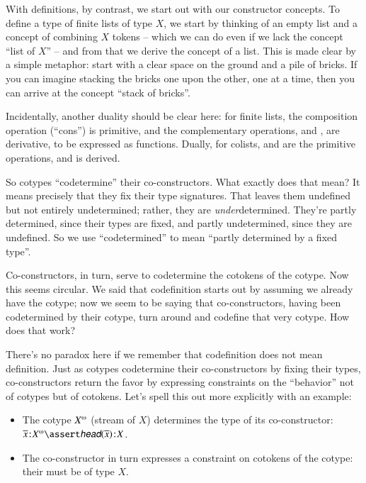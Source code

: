 \documentclass{article}
\begin{document}
With definitions, by contrast, we start out with our constructor
concepts. To define a type of finite lists of type \(X\), we start by
thinking of an empty list and a concept of combining \(X\) tokens --
which we can do even if we lack the concept ``list of \(X\)'' -- and
from that we derive the concept of a list. This is made clear by a
simple metaphor: start with a clear space on the ground and a pile of
bricks. If you can imagine stacking the bricks one upon the other, one
at a time, then you can arrive at the concept ``stack of bricks''.

Incidentally, another duality should be clear here: for finite lists,
the composition operation (``cons'') is primitive, and the
complementary operations, \head{} and \tail{}, are derivative, to be
expressed as functions. Dually, for colists, \cohead{} and \cotail{}
are the primitive operations, and \cocons{} is derived.

So cotypes ``codetermine'' their co-constructors. What exactly does
that mean? It means precisely that they fix their type signatures.
That leaves them undefined but not entirely undetermined; rather, they
are \textit{under}determined. They're partly determined, since their
types are fixed, and partly undetermined, since they are undefined. So
we use ``codetermined'' to mean ``partly determined by a fixed
type''.

Co-constructors, in turn, serve to codetermine the cotokens of the
cotype. Now this seems circular. We said that codefinition starts out
by assuming we already have the cotype; now we seem to be saying that
co-constructors, having been codetermined by their cotype, turn around
and codefine that very cotype. How does that work?

There's no paradox here if we remember that codefinition does not mean
definition. Just as cotypes codetermine their co-constructors by
fixing their types, co-constructors return the favor by expressing
constraints on the ``behavior'' not of cotypes but of cotokens. Let's spell this out more explicitly with an example:

\begin{itemize}
\item The cotype \(\colist{X}\) (stream of \(X\)) determines the type of
  its \cohead{} co-constructor:
  \(\tj{\cotok{x}}{\colist{X}}\linfer\tj{\cohead(\cotok{x})}{X}\).
  \item The co-constructor in turn expresses a constraint on cotokens
    of the cotype: their \cohead{} must be of type \(X\).
\end{itemize}
\end{document}
